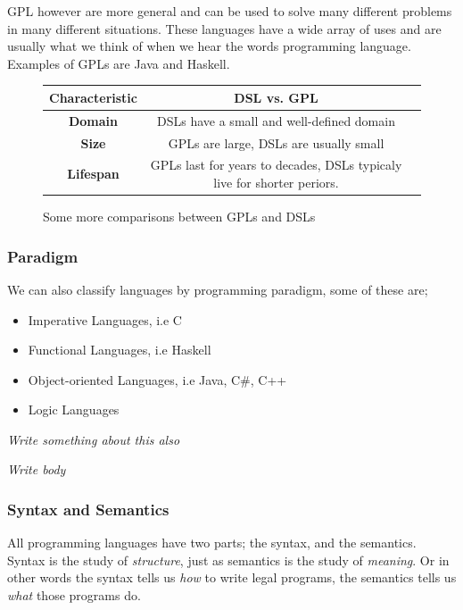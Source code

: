 \documentclass{article}
\DeclareRobustCommand{\comment}[1]{
    {\color{orange}\emph{#1}}
}
\begin{document}
        \Gls{GPL} however are more general and can be used to solve many different problems in many different situations.
        These languages have a wide array
        of uses and are usually what we think of when we hear the words programming language. Examples of GPLs are Java and Haskell.\\
        \begin{figure}[!h]
            \begin{tabular}{|c|c|c}
                \hline
                \textbf{Characteristic} &\textbf{DSL vs. GPL}\\
                \hline
                \textbf{Domain} & DSLs have a small and well-defined domain\\
                \hline
                \textbf{Size} &GPLs are large, DSLs are usually small\\
                \hline
                \textbf{Lifespan} &GPLs last for years to decades, DSLs typicaly live for shorter periors.\\
                \hline
            \end{tabular}%
            \caption{Some more comparisons between GPLs and DSLs}
        \end{figure}%

        \subsubsection*{Paradigm}
        We can also classify languages by programming paradigm, some of these are; 
        \begin{itemize}
            \item Imperative Languages, i.e C
            \item Functional Languages, i.e Haskell
            \item Object-oriented Languages, i.e Java, C\#, C++
            \item Logic Languages
        \end{itemize}
        \comment{Write something about this also}
        \comment{Write body}

        \subsubsection*{Syntax and Semantics}
        All programming languages have two parts; the \gls{syntax}, and the \gls{semantics}.\\
        Syntax is the study of \textit{structure}, just as semantics is the study of \textit{meaning}. Or in other words
        the syntax tells us \textit{how} to write legal programs, the semantics tells us \textit{what} those programs do. 
\end{document}
